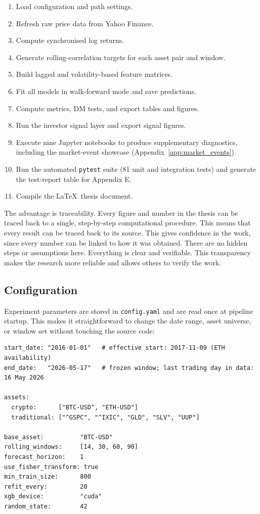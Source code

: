 \begin{enumerate}
    \item Load configuration and path settings.
    \item Refresh raw price data from Yahoo Finance.
    \item Compute synchronised log returns.
    \item Generate rolling-correlation targets for each asset pair and window.
    \item Build lagged and volatility-based feature matrices.
    \item Fit all models in walk-forward mode and save predictions.
    \item Compute metrics, DM tests, and export tables and figures.
    \item Run the investor signal layer and export signal figures.
    \item Execute nine Jupyter notebooks to produce supplementary diagnostics, including the market-event showcase (Appendix~\ref{app:market_events}).
    \item Run the automated \texttt{pytest} suite (81 unit and integration tests) and generate the test-report table for Appendix E.
    \item Compile the \LaTeX\ thesis document.
\end{enumerate}

The advantage is traceability. Every figure and number in the thesis can be traced back to a single, step-by-step computational procedure. This means that every result can be traced back to its source. This gives confidence in the work, since every number can be linked to how it was obtained. There are no hidden steps or assumptions here. Everything is clear and verifiable. This transparency makes the research more reliable and allows others to verify the work.

\subsection{Configuration}

Experiment parameters are stored in \texttt{config.yaml} and are read once at pipeline startup. This makes it straightforward to change the date range, asset universe, or window set without touching the source code:

\begin{lstlisting}[language={}, caption={Excerpt from \texttt{config.yaml} showing key experiment parameters.}, label=lst:config]
start_date: "2016-01-01"   # effective start: 2017-11-09 (ETH availability)
end_date:   "2026-05-17"   # frozen window; last trading day in data: 16 May 2026

assets:
  crypto:      ["BTC-USD", "ETH-USD"]
  traditional: ["^GSPC", "^IXIC", "GLD", "SLV", "UUP"]

base_asset:          "BTC-USD"
rolling_windows:     [14, 30, 60, 90]
forecast_horizon:    1
use_fisher_transform: true
min_train_size:      800
refit_every:         20
xgb_device:          "cuda"
random_state:        42
\end{lstlisting}

